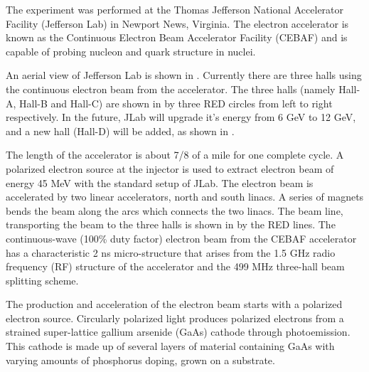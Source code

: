 %
The experiment was performed at the Thomas Jefferson National Accelerator Facility (Jefferson Lab) in Newport News, Virginia. The electron accelerator is known as the Continuous Electron Beam Accelerator Facility (CEBAF) and is capable of probing nucleon and quark structure in nuclei.

%
%
%
An aerial view of Jefferson Lab is shown in . Currently there are three halls using the continuous electron beam from the accelerator. The three halls (namely Hall-A, Hall-B and Hall-C) are shown in  by three RED circles from left to right respectively. In the future, JLab will upgrade it's energy from 6 GeV to 12 GeV, and a new hall (Hall-D) will be added, as shown in .

\setlength{\figwidth}{1.0\linewidth}


%
%
\label{Accelerator}
The length of the accelerator is about 7/8 of a mile for one complete cycle. A polarized electron source at the injector is used to extract electron beam of energy 45 MeV with the standard setup of JLab. The electron beam is accelerated by two linear accelerators, north and south linacs. A series of magnets bends the beam along the arcs which connects the two linacs. The beam line, transporting the beam to the three halls is shown in  by the RED lines. The continuous-wave (100\% duty factor) electron beam from the CEBAF accelerator has a characteristic 2 ns micro-structure that arises from the 1.5 GHz radio frequency (RF) structure of the accelerator and the 499 MHz three-hall beam splitting scheme. 

%
\label{Polarized Source}
The production and acceleration of the electron beam starts with a polarized electron source. Circularly polarized light produces polarized electrons from a strained super-lattice gallium arsenide (GaAs) cathode through photoemission. This cathode is made up of several layers of material containing GaAs with varying amounts of phosphorus doping, grown on a substrate.

